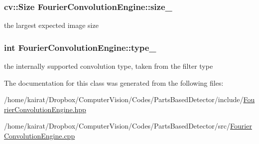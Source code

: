 \subsubsection[{size\+\_\+}]{\setlength{\rightskip}{0pt plus 5cm}cv\+::\+Size Fourier\+Convolution\+Engine\+::size\+\_\+\hspace{0.3cm}{\ttfamily [private]}}\label{classFourierConvolutionEngine_a2375ea1729ad2fe45fe6204130f3f39f}


the largest expected image size 

\hypertarget{classFourierConvolutionEngine_a3e213d98d690b295eaa2866618f17933}{}
\subsubsection[{type\+\_\+}]{\setlength{\rightskip}{0pt plus 5cm}int Fourier\+Convolution\+Engine\+::type\+\_\+\hspace{0.3cm}{\ttfamily [private]}}\label{classFourierConvolutionEngine_a3e213d98d690b295eaa2866618f17933}


the internally supported convolution type, taken from the filter type 



The documentation for this class was generated from the following files\+:\begin{DoxyCompactItemize}
\item 
/home/kairat/\+Dropbox/\+Computer\+Vision/\+Codes/\+Parts\+Based\+Detector/include/\hyperlink{FourierConvolutionEngine_8hpp}{Fourier\+Convolution\+Engine.\+hpp}\item 
/home/kairat/\+Dropbox/\+Computer\+Vision/\+Codes/\+Parts\+Based\+Detector/src/\hyperlink{FourierConvolutionEngine_8cpp}{Fourier\+Convolution\+Engine.\+cpp}\end{DoxyCompactItemize}
